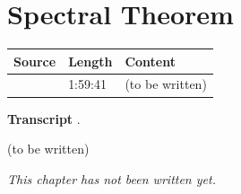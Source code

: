 \chapter{Spectral Theorem}\label{ch:c31}
\begin{paracol}{2}

\begin{sources}
\begin{tabularx}{\linewidth}{@{}l l L@{}}
\toprule
\textbf{Source} & \textbf{Length} & \textbf{Content}\\
\midrule
{} & 1:59:41 & (to be written)\\
\bottomrule
\end{tabularx}

\smallskip
\textbf{Transcript} .
\end{sources}

\begin{reading}
(to be written)
\end{reading}

\emph{This chapter has not been written yet.}

\flushside
\end{paracol}
